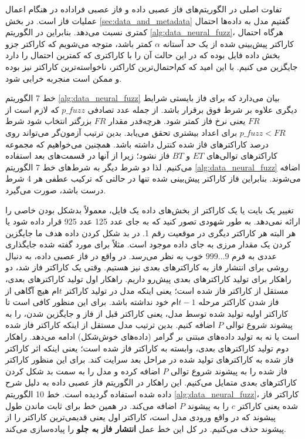  تفاوت اصلی در الگوریتم‌های فاز عصبی داده و فاز عصبی فراداده در هنگام اعمال عملیات فاز است. در بخش \ref{sec:data_and_metadata} گفتیم مدل به داده‌ها احتمال کمتری نسبت می‌دهد. بنابراین در الگوریتم \ref{alg:data_neural_fuzz}، هرگاه احتمال کاراکتر پیش‌بینی شده از یک حد آستانه
  $\alpha$
  کمتر باشد، متوجه می‌شویم که کاراکتر جزو بخش داده فایل بوده که در این حالت آن را با کاراکتری که کمترین احتمال را دارد جایگزین می کنیم. با این امید که کم‌احتمال‌ترین کاراکتر، ناخواسته‌ترین کاراکتر نیز بوده و ممکن است منجربه‌ خرابی شود.
   
  
  خط 7 الگوریتم \ref{alg:data_neural_fuzz} بیان می‌دارد که برای فاز بایستی شرایط دیگری علاوه بر شرط فوق برقرار باشد. از جمله عدد تصادفی 
  $p\_fuzz$
  که لازم است از $FR$ یعنی نرخ فاز کمتر شود. هرچه‌قدر مقدار $FR$ بزرگتر انتخاب شود شرط $p\_fuzz<FR$ برای اعداد بیشتری تحقق می‌یابد. بدین ترتیب آزمون‌گر می‌تواند روی درصد کاراکترهای فاز شده کنترل داشته باشد. %
  همچنین می‌خواهیم که مجموعه کاراکترهای توالی‌های $ET$ و $BT$ فاز نشود؛ زیرا از آنها در قسمت‌های بعد استفاده می‌کنیم. لذا دو شرط دیگر به شرط‌های خط 7 الگوریتم \ref{alg:data_neural_fuzz} اضافه می‌شوند. بنابراین فاز کاراکتر پیش‌بینی شده تنها در حالتی که ترکیب عطفی هر 4 شرط درست باشد، صورت می‌گیرد.
  
  تغییر یک بایت یا یک کاراکتر از بخش‌های داده یک فایل، معمولاً بدشکل بودن خاصی را ارائه نمی‌دهد. به طور شهودی تصور کنید که به جای عدد 125 عدد 925 قرار داده شود یا هر البته هر کاراکتر دیگری در موقعیت رقم 1. در بد شکل کردن داده هدف ما جایگزین کردن یک مقدار مرزی به جای داده موجود است. مثلاً برای مورد گفته شده جایگذاری عددی به فرم
   $999 . . . 9$ 
   خوب به نظر می‌رسد. در واقع در فاز عصبی داده، به دنبال روشی برای انتشار فاز به کاراکترهای بعدی نیز هستیم.
  وقتی یک کاراکتر فاز شد، دو راهکار برای تولید کاراکترهای بعدی پیش‌رو داریم. راهکار اول تولید کاراکترهای بعدی، مستقل از کاراکتر فاز شده است؛ یعنی اینکه مدل در تولید کاراکتر $t$ام هیچ آگاهی از فاز شدن کاراکتر مرحله 
  $t-1$ام 
  خود نداشته باشد. برای این منظور کافی است تا کاراکتر اولیه تولید شده توسط مدل، یعنی کاراکتر قبل از فاز  و جایگزین شدن، را به پیشوند شروع توالی $P$ اضافه کنیم. بدین ترتیب مدل مستقل از اینکه کاراکتر فاز شده است یا نه به تولید داده‌های مبتنی بر گرامر (داده‌های خوش‌شکل) ادامه می‌دهد. راهکار دوم تولید کاراکترهای بعدی، وابسته به کاراکتر فاز شده است؛ یعنی اینکه اثر کاراکتر فاز شده به کاراکترهای تولید شده در مراحل بعد سرایت کند. برای این منظور کاراکتر فاز شده را به پیشوند شروع توالی         
  $P$
  اضافه کرده و مدل را به سمت بد شکل کردن کاراکترهای بعدی متمایل می‌کنیم. این راهکار در الگوریتم فاز عصبی داده به دلیل شرح داده شده استفاده گردیده است. خط 10 الگوریتم 
  \ref{alg:data_neural_fuzz}،
  کاراکتر فاز شده یعنی کاراکتر 
  $c$
  را به پیشوند 
  $P$
  اضافه می‌کند. در همین خط برای ثابت ماندن طول پیشوند که در واقع ورودی مدل است، کاراکتر اول یعنی قدیمی‌ترین کاراکتر را از پیشوند حذف می‌کنیم. در کل این خط عمل 
  \textbf{انتشار فاز به جلو}
  را پیاده‌سازی می‌کند.
 

